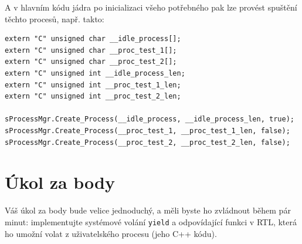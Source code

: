 \documentclass{article}
\begin{document}
A v hlavním kódu jádra po inicializaci všeho potřebného pak lze provést spuštění těchto procesů, např. takto:
\begin{lstlisting}
extern "C" unsigned char __idle_process[];
extern "C" unsigned char __proc_test_1[];
extern "C" unsigned char __proc_test_2[];
extern "C" unsigned int __idle_process_len;
extern "C" unsigned int __proc_test_1_len;
extern "C" unsigned int __proc_test_2_len;

sProcessMgr.Create_Process(__idle_process, __idle_process_len, true);
sProcessMgr.Create_Process(__proc_test_1, __proc_test_1_len, false);
sProcessMgr.Create_Process(__proc_test_2, __proc_test_2_len, false);
\end{lstlisting}


\section{Úkol za body}

Váš úkol za body bude velice jednoduchý, a měli byste ho zvládnout během pár minut: implementujte systémové volání {\tt yield} a odpovídající funkci v RTL, která ho umožní volat z uživatelského procesu (jeho C++ kódu).
\end{document}
